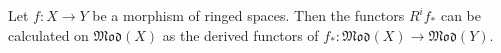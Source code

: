 Let $f : X \to Y$ be a morphism of ringed spaces. Then the functors $R^i f_*$ can be calculated on $\mathfrak{Mod}(X)$ as the derived functors of $f_* : \mathfrak{Mod}(X) \to \mathfrak{Mod}(Y)$.
